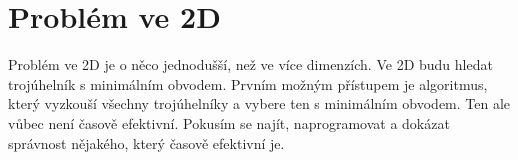 \chapter{Problém ve 2D}
\label{chap:problem2d}
Problém ve 2D je o něco jednodušší, než ve více dimenzích. Ve 2D budu hledat trojúhelník s minimálním obvodem. Prvním možným přístupem je algoritmus, který vyzkouší všechny trojúhelníky a vybere ten s minimálním obvodem. Ten ale vůbec není časově efektivní. Pokusím se najít, naprogramovat a dokázat správnost nějakého, který časově efektivní je. 



\clearpage
